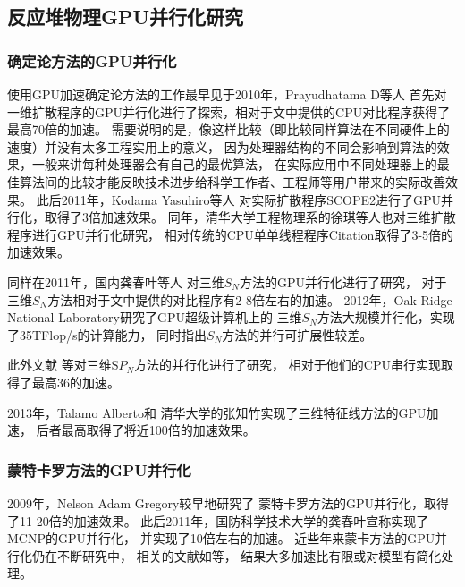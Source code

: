 \subsection{反应堆物理GPU并行化研究}

\subsubsection{确定论方法的GPU并行化}

使用GPU加速确定论方法的工作最早见于2010年，Prayudhatama D等人\cite{prayudhatama2010gpu}
首先对一维扩散程序的GPU并行化进行了探索，相对于文中提供的CPU对比程序获得了最高70倍的加速。
需要说明的是，像这样比较（即比较同样算法在不同硬件上的速度）并没有太多工程实用上的意义，
因为处理器结构的不同会影响到算法的效果，一般来讲每种处理器会有自己的最优算法，
在实际应用中不同处理器上的最佳算法间的比较才能反映技术进步给科学工作者、工程师等用户带来的实际改善效果。
此后2011年，Kodama Yasuhiro等人\cite{kodamastudy}
对实际扩散程序SCOPE2进行了GPU并行化，取得了3倍加速效果。
同年，清华大学工程物理系的徐琪等人\cite{xuqi_gpu_old}也对三维扩散程序进行GPU并行化研究，
相对传统的CPU单单线程程序Citation取得了3-5倍的加速效果。

同样在2011年，国内龚春叶等人\cite{gong2011gpu, gong2012particle, gongyechun}
对三维$S_N$方法的GPU并行化进行了研究，
对于三维$S_N$方法相对于文中提供的对比程序有2-8倍左右的加速。
2012年，Oak Ridge National Laboratory研究了\cite{baker2012high}GPU超级计算机上的
三维$S_N$方法大规模并行化，实现了35TFlop/s的计算能力，
同时指出$S_N$方法的并行可扩展性较差。

此外文献
等对三维$\mathrm{S}P_N$方法的并行化进行了研究，
相对于他们的CPU串行实现取得了最高36的加速。

2013年，Talamo Alberto\cite{talamo2013numerical}和
清华大学的张知竹\cite{zhangzhizhu}实现了三维特征线方法的GPU加速，
后者最高取得了将近100倍的加速效果。

\subsubsection{蒙特卡罗方法的GPU并行化}

2009年，Nelson Adam Gregory\cite{nelson2009monte}较早地研究了
蒙特卡罗方法的GPU并行化，取得了11-20倍的加速效果。
此后2011年，国防科学技术大学的龚春叶宣称实现了MCNP的GPU并行化\cite{gongyechun}，
并实现了10倍左右的加速。
近些年来蒙卡方法的GPU并行化仍在不断研究中，
相关的文献如等，
结果大多加速比有限或对模型有简化处理。

